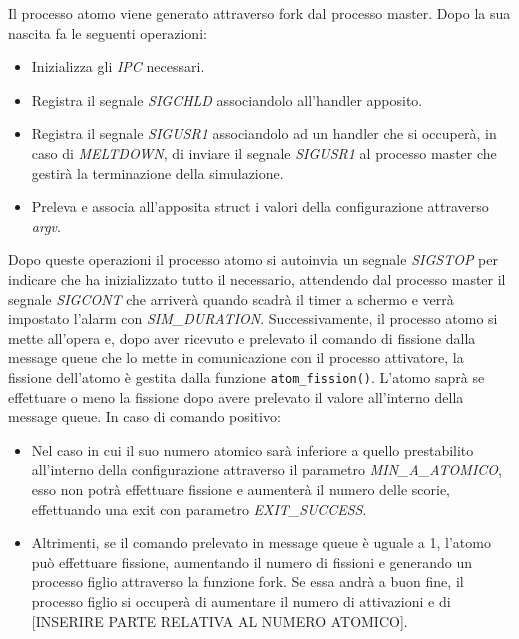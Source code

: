 Il processo atomo viene generato attraverso fork dal processo master. Dopo la sua nascita fa le seguenti operazioni:
\begin{itemize}
    \item Inizializza gli \textit{IPC} necessari.
    \item Registra il segnale \textit{SIGCHLD} associandolo all'handler apposito. 
    \item Registra il segnale \textit{SIGUSR1} associandolo ad un handler che si occuperà, in caso di \textit{MELTDOWN}, di inviare il segnale \textit{SIGUSR1} al processo master che gestirà la terminazione della simulazione. 
    \item Preleva e associa all'apposita struct i valori della configurazione attraverso \textit{argv}. 
\end{itemize}
Dopo queste operazioni il processo atomo si autoinvia un segnale \textit{SIGSTOP} per indicare che ha inizializzato tutto il necessario, attendendo dal processo master il segnale \textit{SIGCONT} che arriverà quando scadrà il timer a schermo e verrà impostato l'alarm con \textit{SIM_DURATION}. Successivamente, il processo atomo si mette all'opera e, dopo aver ricevuto e prelevato il comando di fissione dalla message queue che lo mette in comunicazione con il processo attivatore, la fissione dell'atomo è gestita dalla funzione \lstinline{atom_fission()}. L'atomo saprà se effettuare o meno la fissione dopo avere prelevato il valore all'interno della message queue. In caso di comando positivo:
\begin{itemize}
    \item Nel caso in cui il suo numero atomico sarà inferiore a quello prestabilito all'interno della configurazione attraverso il parametro \textit{MIN_A_ATOMICO}, esso non potrà effettuare fissione e aumenterà il numero delle scorie, effettuando una exit con parametro \textit{EXIT_SUCCESS}.
    \item Altrimenti, se il comando prelevato in message queue è uguale a 1, l'atomo può effettuare fissione, aumentando il numero di fissioni e generando un processo figlio attraverso la funzione fork. Se essa andrà a buon fine, il processo figlio si occuperà di aumentare il numero di attivazioni e di [INSERIRE PARTE RELATIVA AL NUMERO ATOMICO].
\end{itemize}
